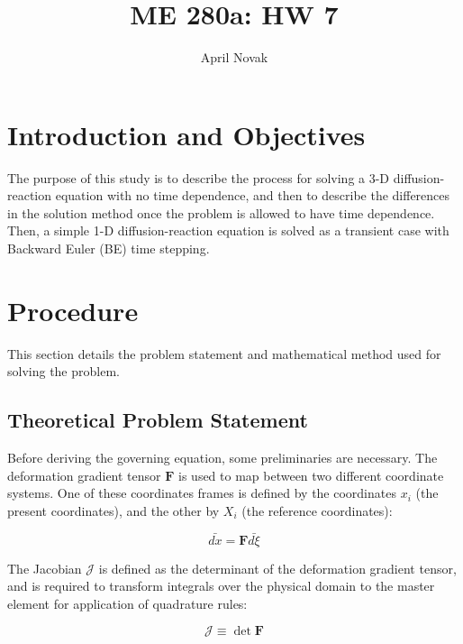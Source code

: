 \documentclass[10pt]{article}
\begin{document}
\title{ME 280a: HW 7}
\author{April Novak}

\maketitle

\section{Introduction and Objectives}

The purpose of this study is to describe the process for solving a 3-D diffusion-reaction equation with no time dependence, and then to describe the differences in the solution method once the problem is allowed to have time dependence. Then, a simple 1-D diffusion-reaction equation is solved as a transient case with Backward Euler (BE) time stepping.

\section{Procedure}
\label{sec:Procedure}

This section details the problem statement and mathematical method used for solving the problem.

\subsection{Theoretical Problem Statement}

Before deriving the governing equation, some preliminaries are necessary. The deformation gradient tensor \(\textbf{F}\) is used to map between two different coordinate systems. One of these coordinates frames is defined by the coordinates \(x_i\) (the present coordinates), and the other by \(X_i\) (the reference coordinates):

\begin{equation}
\label{eq:DeformationGradient}
\bar{dx}=\textbf{F}\bar{d\xi}
\end{equation}

The Jacobian \(\mathscr{J}\) is defined as the determinant of the deformation gradient tensor, and is required to transform integrals over the physical domain to the master element for application of quadrature rules:

\begin{equation}
\label{eq:Jacobian}
\mathscr{J}\equiv \det{\textbf{F}}
\end{equation}
\end{document}
